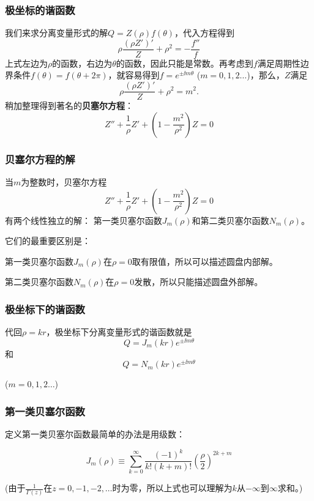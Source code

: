 \documentclass[CJK]{beamer}
\begin{document}
\begin{frame}
  \frametitle{极坐标的谐函数}
  
  我们来求分离变量形式的解$Q = Z(\rho)f(\theta)$，代入方程得到
  $$ \rho\frac{(\rho Z')' }{Z}+ \rho^2 = -  \frac{f''}{f} $$
  上式左边为$\rho$的函数，右边为$\theta$的函数，因此只能是常数。再考虑到$f$满足周期性边界条件$f(\theta)=f(\theta+2\pi)$，就容易得到$f=e^{\pm \ii m\theta}$ ($m=0,1,2\ldots$)，那么，$Z$满足
  $$ \rho\frac{(\rho Z')' }{Z}+ \rho^2 = m^2. $$  
  稍加整理得到著名的{\bf \blue 贝塞尔方程}：
  $$  Z'' + \frac{1}{\rho} Z' + (1-\frac{m^2}{\rho^2}) Z = 0$$
  
\end{frame}


\begin{frame}
  \frametitle{贝塞尔方程的解}
  
  当$m$为整数时，贝塞尔方程
  $$  Z'' + \frac{1}{\rho} Z' + (1-\frac{m^2}{\rho^2}) Z = 0$$
  有两个线性独立的解：
  {\blue 第一类贝塞尔函数$J_m(\rho)$和第二类贝塞尔函数$N_m(\rho)$}。

  \skiplines
  
  它们的最重要区别是：
  \bitem
\item{ 第一类贝塞尔函数$J_m(\rho)$在$\rho=0$取有限值，所以可以描述圆盘内部解。}
\item{ 第二类贝塞尔函数$N_m(\rho)$在$\rho=0$发散，所以只能描述圆盘外部解。}  
  \eitem
  
\end{frame}

\begin{frame}
  \frametitle{极坐标下的谐函数}
  
  代回$\rho=kr$，极坐标下分离变量形式的谐函数就是
  $$ Q = J_m(kr)e^{\pm \ii m\theta} $$
  和
  $$ Q = N_m(kr)e^{\pm \ii m\theta} $$

  ($m=0,1,2\ldots$)
  
\end{frame}

\begin{frame}
  \frametitle{第一类贝塞尔函数}
  
  定义第一类贝塞尔函数最简单的办法是用级数：

  $$J_m(\rho) \equiv\sum_{k=0}^\infty\frac{(-1)^k}{k!(k+m)!} \left(\frac{\rho}{2}\right)^{2k+m}$$


  \skiplines

  (由于$\frac{1}{\Gamma(z)}$在$z=0,-1,-2,\dots$时为零，所以上式也可以理解为$k$从$-\infty$到$\infty$求和。)
  
\end{frame}
\end{document}
